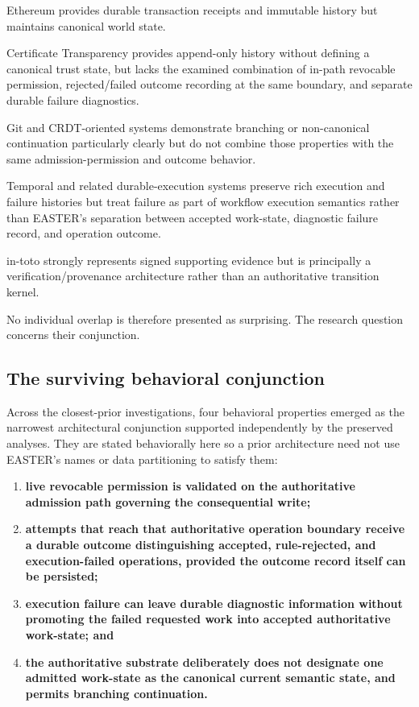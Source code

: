 \documentclass[11pt]{article}
\begin{document}
Ethereum provides durable transaction receipts and immutable history but maintains canonical world state.

Certificate Transparency provides append-only history without defining a canonical trust state, but lacks the examined combination of in-path revocable permission, rejected/failed outcome recording at the same boundary, and separate durable failure diagnostics.

Git and CRDT-oriented systems demonstrate branching or non-canonical continuation particularly clearly but do not combine those properties with the same admission-permission and outcome behavior.

Temporal and related durable-execution systems preserve rich execution and failure histories but treat failure as part of workflow execution semantics rather than EASTER's separation between accepted work-state, diagnostic failure record, and operation outcome.

in-toto strongly represents signed supporting evidence but is principally a verification/provenance architecture rather than an authoritative transition kernel.

No individual overlap is therefore presented as surprising. The research question concerns their conjunction.

\subsection{The surviving behavioral conjunction}

Across the closest-prior investigations, four behavioral properties emerged as the narrowest architectural conjunction supported independently by the preserved analyses. They are stated behaviorally here so a prior architecture need not use EASTER's names or data partitioning to satisfy them:

\begin{enumerate}
\item \textbf{live revocable permission is validated on the authoritative admission path governing the consequential write;}
\item \textbf{attempts that reach that authoritative operation boundary receive a durable outcome distinguishing accepted, rule-rejected, and execution-failed operations, provided the outcome record itself can be persisted;}
\item \textbf{execution failure can leave durable diagnostic information without promoting the failed requested work into accepted authoritative work-state; and}
\item \textbf{the authoritative substrate deliberately does not designate one admitted work-state as the canonical current semantic state, and permits branching continuation.}
\end{enumerate}
\end{document}
